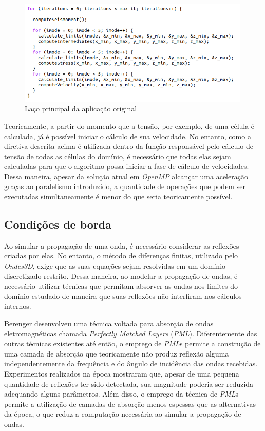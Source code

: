 \documentclass[cic,tc]{iiufrgs}
\begin{document}
\begin{figure}[!htb]
    \caption{Laço principal da aplicação original}
    \begin{center}
      \includegraphics[width=30em]{main_loop}
    \end{center}
    \label{fig:main_loop}
\end{figure}

Teoricamente, a partir do momento que a tensão, por exemplo, de uma célula é calculada, já é possível iniciar o cálculo de sua velocidade. No entanto, como a diretiva descrita acima 
é utilizada dentro da função responsável pelo cálculo de tensão de todas as células do domínio, é necessário que todas elas sejam calculadas para que o algoritmo possa iniciar a fase de
cálculo de velocidades. Dessa maneira, apesar da solução atual em \textit{OpenMP} alcançar uma aceleração graças ao paralelismo introduzido, a quantidade de operações que podem ser executadas simultaneamente
é menor do que seria teoricamente possível. 

\subsection{Condições de borda}

Ao simular a propagação de uma onda, é necessário considerar as reflexões criadas por elas. No entanto, o método de diferenças finitas, utilizado pelo \textit{Ondes3D}, exige que as suas
equações sejam resolvidas em um domínio discretizado restrito. Dessa maneira, ao modelar a propagação de ondas, é necessário utilizar técnicas que permitam absorver as ondas nos limites
do domínio estudado de maneira que suas reflexões não interfiram nos cálculos internos.

Berenger \cite{PML} desenvolveu uma técnica voltada para absorção de ondas eletromagnéticas chamada \textit{Perfectly Matched Layers} (\textit{PML}). Diferentemente
das outras técnicas existentes até então, o emprego de \textit{PML}s permite a construção de uma camada de absorção que teoricamente não produz reflexão alguma independentemente
da frequência e do ângulo de incidência das ondas recebidas. Experimentos realizados na época mostraram que, apesar de uma pequena quantidade de reflexões ter sido detectada,
sua magnitude poderia ser reduzida adequando alguns parâmetros. Além disso, o emprego da técnica de \textit{PML}s permite a utilização de camadas de absorção menos espessas que as
alternativas da época, o que reduz a computação necessária ao simular a propagação de ondas.
\end{document}

